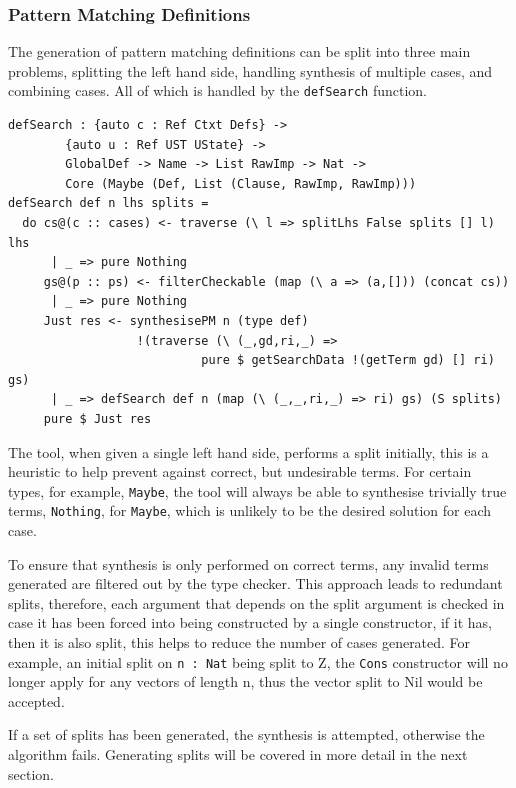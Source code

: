 \documentclass[a4paper]{article}
\begin{document}
\subsubsection{Pattern Matching Definitions}

The generation of pattern matching definitions can be split into three main
problems, splitting the left hand side, handling synthesis of multiple
cases, and combining cases. All of which is handled by the
\texttt{defSearch} function.

\begin{center}
  \begin{verbatim}
defSearch : {auto c : Ref Ctxt Defs} ->
        {auto u : Ref UST UState} -> 
        GlobalDef -> Name -> List RawImp -> Nat ->
        Core (Maybe (Def, List (Clause, RawImp, RawImp)))
defSearch def n lhs splits = 
  do cs@(c :: cases) <- traverse (\ l => splitLhs False splits [] l) lhs 
      | _ => pure Nothing
     gs@(p :: ps) <- filterCheckable (map (\ a => (a,[])) (concat cs))
      | _ => pure Nothing
     Just res <- synthesisePM n (type def)
                  !(traverse (\ (_,gd,ri,_) => 
                           pure $ getSearchData !(getTerm gd) [] ri) gs)
      | _ => defSearch def n (map (\ (_,_,ri,_) => ri) gs) (S splits) 
     pure $ Just res

  \end{verbatim}
\end{center}

The tool, when given a single left hand side, performs a split
initially, this is a heuristic to help prevent against correct,
but undesirable terms. For certain types, for example, \texttt{Maybe},
the tool will always be able to synthesise trivially true terms, \texttt{Nothing}, for \texttt{Maybe}, which
is unlikely to be the desired solution for each case. 

To ensure that synthesis is only performed on
correct terms, any invalid terms generated are filtered out by the type checker.
This approach leads to redundant splits, therefore, each argument that depends
on the split argument is checked in case it has been forced into being constructed 
by a single constructor, if it has, then it is also split, this helps to reduce the number of
cases generated. For example, an initial split on \texttt{n : Nat} being split to Z, the \texttt{Cons}
constructor will no longer apply for any vectors of length n, thus the vector
split to Nil would be accepted.

If a set of splits has been generated, the synthesis is attempted, otherwise the
algorithm fails. Generating splits will be covered in more detail in the next section.
\end{document}
